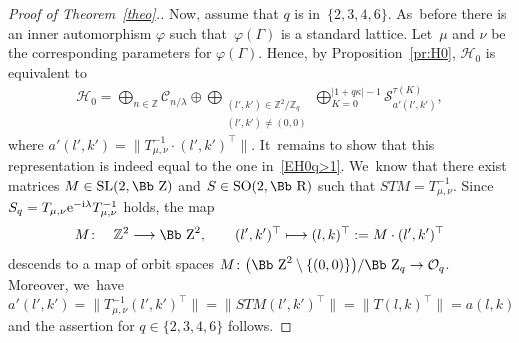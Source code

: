 \documentclass[pdftex]{sigma}
\newcommand\RR{{\mbox{\Bb R}}}
\newcommand\ZZ{{\mbox{\Bb Z}}}
\newcommand\Z{{\mathbb Z}}
\newcommand\cC{{\mathcal C}}
\newcommand\cH{{\mathcal H}}
\newcommand\cO{{\mathcal O}}
\newcommand\ph{\varphi}
\newcommand{\SL}{\mathop{{\rm SL}}}
\newcommand{\SO}{\mathop{{\rm SO}}}
\numberwithin{equation}{section}
\begin{document}
\begin{proof}[Proof of Theorem~\ref{theo}.]
Now, assume that $q$ is in~$\{2,3,4,6\}$. As~before there is an inner automorphism $\ph$ such that~$\varphi(\Gamma)$ is a standard lattice. Let~$\mu$ and $\nu$ be the corresponding parameters for $\ph(\Gamma)$.
Hence, by Proposition~\ref{pr:H0}, $\cH_0$ is equivalent to
\begin{gather*}
\cH_0=\bigoplus_{n\in \Z} \cC_{n/\lambda} \oplus \bigoplus _{\substack{(l',k')\in\Z^2/\Z_q\\(l',k')\not=(0,0)}} \bigoplus_{K=0}^{|1+q\kappa|-1} {\mathcal S}_{a'(l',k')}^{\tau(K)},
\end{gather*}
 where $a'(l',k')=\big\|T_{\mu,\nu}^{-1}\cdot(l',k')^\top\big\|$. It~remains to show that this representation is indeed equal to the one in~\eqref{EH0q>1}. We~know that there exist matrices $M\in\SL(2,\ZZ)$ and $S\in\SO(2,\RR)$ such that $STM=T_{\mu,\nu}^{-1}$.
Since $S_q=T_{\mu,\nu}{\rm e}^{-{\rm i}\lambda}T_{\mu,\nu}^{-1}$ holds, the map
\begin{gather*}
M\colon\quad \Z^2\longrightarrow \ZZ^2,\qquad (l',k')^\top\longmapsto (l,k)^\top:=M\cdot (l',k')^\top
\end{gather*} descends to a map of orbit spaces $M\colon \big(\ZZ^2\setminus\{(0,0)\}\big)/\ZZ_q\rightarrow \cO_q$.
Moreover, we~have $a'(l',k')=\big\|T_{\mu,\nu}^{-1}(l',k')^\top\big\|=\big\|STM(l',k')^\top\big\|=\big\|T(l,k)^\top\big\|=a(l,k)$ and the assertion for $q\in\{2,3,4,6\}$ follows.
\end{proof}
\end{document}
